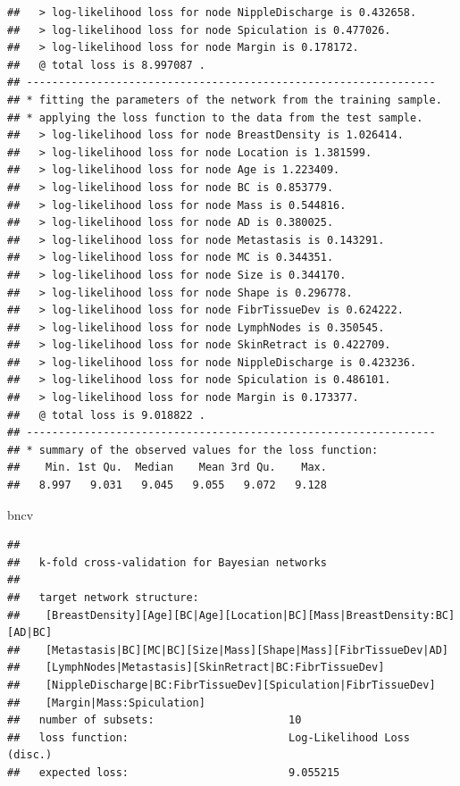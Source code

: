 \documentclass[]{article}
\newenvironment{Shaded}{\begin{snugshade}}{\end{snugshade}}
\newcommand{\NormalTok}[1]{{#1}}
\begin{document}
\begin{verbatim}
##   > log-likelihood loss for node NippleDischarge is 0.432658.
##   > log-likelihood loss for node Spiculation is 0.477026.
##   > log-likelihood loss for node Margin is 0.178172.
##   @ total loss is 8.997087 .
## ----------------------------------------------------------------
## * fitting the parameters of the network from the training sample.
## * applying the loss function to the data from the test sample.
##   > log-likelihood loss for node BreastDensity is 1.026414.
##   > log-likelihood loss for node Location is 1.381599.
##   > log-likelihood loss for node Age is 1.223409.
##   > log-likelihood loss for node BC is 0.853779.
##   > log-likelihood loss for node Mass is 0.544816.
##   > log-likelihood loss for node AD is 0.380025.
##   > log-likelihood loss for node Metastasis is 0.143291.
##   > log-likelihood loss for node MC is 0.344351.
##   > log-likelihood loss for node Size is 0.344170.
##   > log-likelihood loss for node Shape is 0.296778.
##   > log-likelihood loss for node FibrTissueDev is 0.624222.
##   > log-likelihood loss for node LymphNodes is 0.350545.
##   > log-likelihood loss for node SkinRetract is 0.422709.
##   > log-likelihood loss for node NippleDischarge is 0.423236.
##   > log-likelihood loss for node Spiculation is 0.486101.
##   > log-likelihood loss for node Margin is 0.173377.
##   @ total loss is 9.018822 .
## ----------------------------------------------------------------
## * summary of the observed values for the loss function:
##    Min. 1st Qu.  Median    Mean 3rd Qu.    Max. 
##   8.997   9.031   9.045   9.055   9.072   9.128
\end{verbatim}

\begin{Shaded}
\begin{Highlighting}[]
\NormalTok{bncv}
\end{Highlighting}
\end{Shaded}

\begin{verbatim}
## 
##   k-fold cross-validation for Bayesian networks
## 
##   target network structure:
##    [BreastDensity][Age][BC|Age][Location|BC][Mass|BreastDensity:BC][AD|BC]
##    [Metastasis|BC][MC|BC][Size|Mass][Shape|Mass][FibrTissueDev|AD]
##    [LymphNodes|Metastasis][SkinRetract|BC:FibrTissueDev]
##    [NippleDischarge|BC:FibrTissueDev][Spiculation|FibrTissueDev]
##    [Margin|Mass:Spiculation]
##   number of subsets:                     10 
##   loss function:                         Log-Likelihood Loss (disc.) 
##   expected loss:                         9.055215
\end{verbatim}
\end{document}
